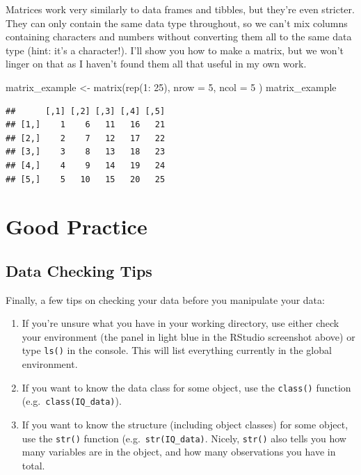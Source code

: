 \documentclass[
]{book}
\newenvironment{Shaded}{\begin{snugshade}}{\end{snugshade}}
\newcommand{\AttributeTok}[1]{\textcolor[rgb]{0.77,0.63,0.00}{#1}}
\newcommand{\DecValTok}[1]{\textcolor[rgb]{0.00,0.00,0.81}{#1}}
\newcommand{\FunctionTok}[1]{\textcolor[rgb]{0.00,0.00,0.00}{#1}}
\newcommand{\NormalTok}[1]{#1}
\newcommand{\OtherTok}[1]{\textcolor[rgb]{0.56,0.35,0.01}{#1}}
\newcommand{\SpecialCharTok}[1]{\textcolor[rgb]{0.00,0.00,0.00}{#1}}
\providecommand{\tightlist}{%
  \setlength{\itemsep}{0pt}\setlength{\parskip}{0pt}}
\begin{document}
Matrices work very similarly to data frames and tibbles, but they're even stricter. They can only contain the same data type throughout, so we can't mix columns containing characters and numbers without converting them all to the same data type (hint: it's a character!). I'll show you how to make a matrix, but we won't linger on that as I haven't found them all that useful in my own work.

\begin{Shaded}
\begin{Highlighting}[]
\NormalTok{matrix\_example }\OtherTok{\textless{}{-}} \FunctionTok{matrix}\NormalTok{(}\FunctionTok{rep}\NormalTok{(}\DecValTok{1}\SpecialCharTok{:} \DecValTok{25}\NormalTok{),}
                         \AttributeTok{nrow =} \DecValTok{5}\NormalTok{,}
                         \AttributeTok{ncol =} \DecValTok{5}
\NormalTok{                         )}
\NormalTok{matrix\_example}
\end{Highlighting}
\end{Shaded}

\begin{verbatim}
##      [,1] [,2] [,3] [,4] [,5]
## [1,]    1    6   11   16   21
## [2,]    2    7   12   17   22
## [3,]    3    8   13   18   23
## [4,]    4    9   14   19   24
## [5,]    5   10   15   20   25
\end{verbatim}

\hypertarget{good-practice}{%
\section{Good Practice}\label{good-practice}}

\hypertarget{data-checking-tips}{%
\subsection{Data Checking Tips}\label{data-checking-tips}}

Finally, a few tips on checking your data before you manipulate your data:

\begin{enumerate}
\def\labelenumi{\arabic{enumi}.}
\tightlist
\item
  If you're unsure what you have in your working directory, use either check your environment (the panel in light blue in the RStudio screenshot above) or type \texttt{ls()} in the console. This will list everything currently in the global environment.
\item
  If you want to know the data class for some object, use the \texttt{class()} function (e.g.~\texttt{class(IQ\_data)}).
\item
  If you want to know the structure (including object classes) for some object, use the \texttt{str()} function (e.g.~\texttt{str(IQ\_data)}. Nicely, \texttt{str()} also tells you how many variables are in the object, and how many observations you have in total.
\end{enumerate}
\end{document}
